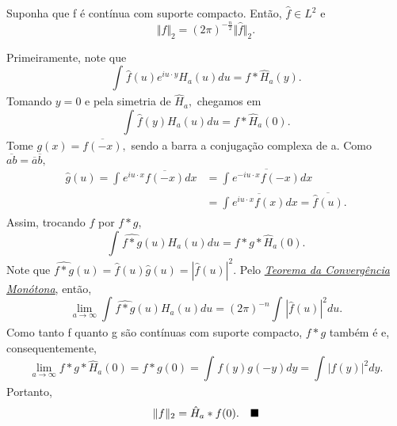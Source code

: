 \documentclass[measure_theory.tex]{subfiles}
\begin{document}
\hypertarget{plancherel}{
	\begin{theorem*}
		Suponha que f é contínua com suporte compacto. Então, \(\hat{f}\in L^{2}\) e
		\[
			\Vert f \Vert_{2} = (2\pi )^{-\frac{n}{2}}\Vert \hat{f} \Vert_{2}.
		\]
	\end{theorem*}
}
\begin{proof*}
	Primeiramente, note que
	\[
		\int_{}^{}\hat{f}(u)e^{iu \cdot y}H_{a}(u)du = f*\hat{H}_{a}(y).
	\]
	Tomando \(y=0\) e pela simetria de \(\hat{H}_{a},\) chegamos em
	\[
		\int_{}^{}\hat{f}(y)H_{a}(u)du = f* \hat{H}_{a}(0).
	\]
	Tome \(g(x) = \overline{f(-x)},\) sendo a barra a conjugação complexa de a. Como \(\overline{ab} = \overline{a}\overline{b},\)
	\begin{align*}
		\hat{g}(u) = \int_{}^{}e^{iu \cdot x}\overline{f(-x)}dx & = \overline{\int_{}^{}e^{-i u \cdot x}f(-x)dx}                       \\
		                                                        & = \overline{\int_{}^{}e^{iu \cdot x}f(x)dx} = \overline{\hat{f}(u)}.
	\end{align*}
	Assim, trocando \(f\) por \(f*g\),
	\[
		\int_{}^{}\widehat{f*g}(u)H_{a}(u)du = f*g*\hat{H}_{a}(0).
	\]
	Note que \(\widehat{f*g}(u) = \hat{f}(u)\hat{g}(u) = |\hat{f}(u)|^{2}\). Pelo \hyperlink{monotone_convergence}{\textit{Teorema da Convergência Monótona},} então,
	\[
		\lim_{a\to \infty}\int_{}^{}\widehat{f*g}(u)H_{a}(u)du = (2\pi )^{-n}\int_{}^{}|\hat{f}(u)|^{2}du.
	\]
	Como tanto f quanto g são contínuas com suporte compacto, \(f*g\) também é e, consequentemente,
	\[
		\lim_{a\to \infty}f*g*\hat{H}_{a}(0) = f*g(0) = \int_{}^{}f(y)g(-y)dy = \int_{}^{}|f(y)|^{2}dy.
	\]
	Portanto,
	\[
		\Vert f \Vert_{2} = \hat{H}_{a}*f(0).\quad \text{$\blacksquare$}
	\]
\end{proof*}
\end{document}

